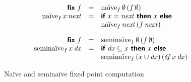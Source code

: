 \documentclass[sigplan,screen,review,timestamp]{acmart}
\begin{document}
\begin{figure}
  \[
  \begin{array}{rcl}
  \efix f &=& \tlv{na\"ive}_f \,\emptyset \,(f\, \emptyset)\\
  \tlv{na\"ive}_f \,x \,\var{next}
  &=& \kw{if}~ x = \var{next} ~\kw{then}~ x ~\kw{else}\\
  && \tlv{na\"ive}_f \,\var{next} \,(f \,\var{next})

  \vspace{1em}\\

  \efix f &=& \tlv{semina\"ive}_f \,\emptyset \,(f\, \emptyset)\\
  \tlv{semina\"ive}_f \,x \,\dee x
  &=& \kw{if}~ \dee x \subseteq x ~\kw{then}~ x ~\kw{else}\\
  && \tlv{semina\"ive}_f \,(x \cup \dee x) \,(\d\!f \,x \,\dee x)

  \end{array}
  \]  
  \caption{Na\"ive and semina\"ive fixed point computation}
\end{figure}

\end{document}
